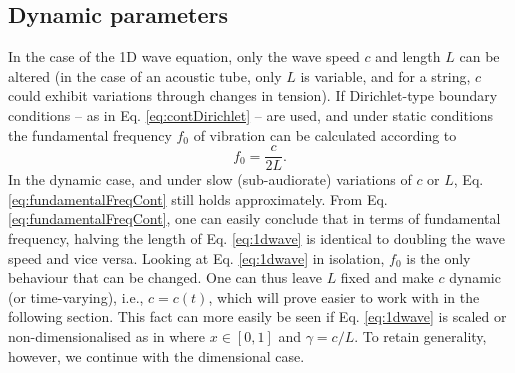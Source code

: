 \subsection{Dynamic parameters}\label{sec:dynamicParamsCont}
In the case of the 1D wave equation, only the wave speed $c$ and length $L$ can be altered (in the case of an acoustic tube, only $L$ is variable, and for a string, $c$ could exhibit variations through changes in tension). If Dirichlet-type boundary conditions -- as in Eq. \eqref{eq:contDirichlet} -- are used, and under static conditions the fundamental frequency $f_0$ of vibration can be calculated according to
\begin{equation}\label{eq:fundamentalFreqCont}
    f_0 = \frac{c}{2L}.
\end{equation}
In the dynamic case, and under slow (sub-audiorate) variations of $c$ or $L$, Eq. \eqref{eq:fundamentalFreqCont} still holds approximately.
%
From Eq. \eqref{eq:fundamentalFreqCont}, one can easily conclude that in terms of fundamental frequency, halving the length of Eq. \eqref{eq:1dwave} is identical to doubling the wave speed and vice versa. Looking at Eq. \eqref{eq:1dwave} in isolation, $f_0$ is the only behaviour that can be changed. One can thus leave $L$ fixed %
and make $c$ dynamic (or time-varying), i.e., $c = c(t)$, which will prove easier to work with in the following section. This fact can more easily be seen if Eq. \eqref{eq:1dwave} is scaled or non-dimensionalised as in \cite{bilbao2009} where $x\in[0, 1]$ and $\gamma = c/L$. To retain generality, however, we continue with the dimensional case.
